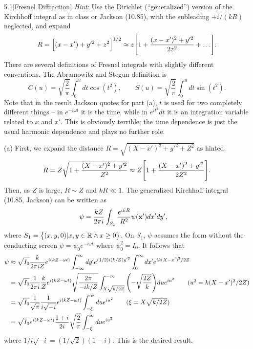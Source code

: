 \documentclass[12pt]{article}
\begin{document}
\begin{problem}{5.1}[Fresnel Diffraction]
\textit{Hint}: Use the Dirichlet (``generalized'') version of the Kirchhoff
integral as in class or Jackson (10.85), with the subleading $+i/(kR)$
neglected, and expand
\begin{equation}
    R=\qty[(x-x')+y'^2+z^2]^{1/2}\approx
    z\qty[1+\frac{(x-x')^2+y'^2}{2z^2}+\hdots].
\end{equation}
There are several definitions of Fresnel integrals with slightly different
conventions. The Abramowitz and Stegun definition is
\begin{equation}
    C(u)=\sqrt{\frac2\pi}\int_0^udt\cos(t^2),
    \qquad
    S(u)=\sqrt{\frac2\pi}\int_0^u dt\sin(t^2).
\end{equation}
Note that in the result Jackson quotes for part (a), $t$ is used for two
completely different things -- in $e^{-i\omega t}$ it is the time, while in
$e^{it^2}dt$ it is an integration variable related to $x$ and $x'$. This is
obviously terrible; the time dependence is just the usual harmonic dependence
and plays no further role.
\begin{solution}
(a) First, we expand the distance $R=\sqrt{(X-x')^2+y'^2+Z^2}$ as hinted.
\begin{equation}
    R=Z\sqrt{1+\frac{(X-x')^2+y'^2}{Z^2}}
    \approx Z\qty[1+\frac{(X-x')^2+y'^2}{2Z^2}].
\end{equation}
Then, as $Z$ is large, $R\sim Z$ and $kR\ll 1$. The generalized Kirchhoff
integral (10.85, Jackson) can be written as
\begin{align}\label{p1:psi}
    \psi
    &=\frac{kZ}{2\pi i}\int_{S_1}\frac{e^{ikR}}{R^2}\psi(\vb{x}')dx'dy',
\end{align}
where $S_1=\qty{(x,y,0)|x,y\in\mathbb{R}\wedge x\geq0}$. On $S_1$,
$\psi$ assumes the form without the conducting screen
$\psi=\psi_0e^{-i\omega t}$ where $\psi_0^2=I_0$. It follows that
\begin{align}
    \psi
    &\approx \sqrt{I_0}\frac{k}{2\pi iZ}e^{i(kZ-\omega t)}
    \int_{-\infty}^\infty dy'e^{(1/2)i(k/Z)y'^2}
    \int_0^\infty dx' e^{ik(X-x')^2/2Z}\notag\\
    &=\sqrt{I_0}\frac1{2\pi i}\frac{k}{Z}e^{i(kZ-\omega t)}
        \sqrt{\frac{2\pi}{-ik/Z}}\int_{X\sqrt{k/2Z}}^{-\infty}\qty(-\sqrt{\frac{2Z}{k}})du
        e^{iu^2}\tag{$u^2=k(X-x')^2/2Z$}\\
    &=\sqrt{I_0}\frac{1}{\sqrt\pi}\frac1{i\sqrt{-i}}e^{i(kZ-\omega t)}
    \int_{-\xi}^\infty due^{iu^2}\tag{$\xi=X\sqrt{k/2Z}$}\notag\\
    &=\sqrt{I_0}e^{i(kZ-\omega t)}\frac{1+i}{2i}\sqrt{\frac2\pi}
    \int_{-\xi}^\infty du e^{iu^2}
\end{align}
where $1/i\sqrt{-i}=(1/\sqrt2)(1-i)$. This is the desired result.


\end{solution}
\end{problem}
\end{document}
